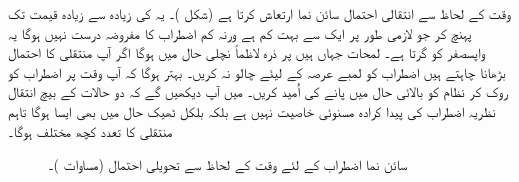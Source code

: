 وقت کے لحاظ سے انتقالی احتمال سائن نما ارتعاش کرتا ہے (شکل )۔ یہ  کی زیادہ سے زیادہ قیمت تک پہنچ کر جو لازمی طور پر ایک   سے بہت کم ہے ورنہ کم اضطراب کا مفروضہ درست نہیں ہوگا یہ واپسصفر کو گرتا ہے۔ لمحات  جہاں  ہیں پر ذرہ لاظماً نچلی حال میں ہوگا اگر آپ منتقلی کا احتمال بڑھانا چاہتے ہیں اضطراب کو لمبے عرصہ کے لیئے چالو نہ کریں۔ بہتر ہوگا کہ آپ وقت  پر اضطراب کو روک کر نظام کو بالائی حال میں پانے کی اُمید کریں۔  میں آپ دیکھیں گے کہ دو حالات کے بیچ انتقال نظریہ اضطراب کی پیدا کرادہ  مسنوئی خاصیت  نہیں ہے بلکہ بلکل ٹھیک حال میں بھی ایسا ہوگا تاہم منتقلی کا تعدد کچھ مختلف ہوگا۔

\begin{figure}
\centering
{}
\caption{سائن نما اضطراب کے لئے وقت کے لحاظ سے تحویلی احتمال (مساوات )۔}
\label{شکل_تابع_وقت_احتمال_سائن_نما_احتمال}
\end{figure}



